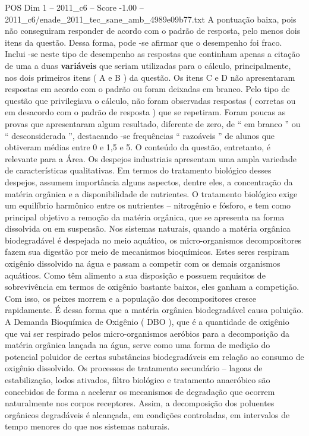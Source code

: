 \begin{textsample}{POS Dim 1 – 2011\_c6 – Score -1.00 – 2011\_c6/enade\_2011\_tec\_sane\_amb\_4989e09b77.txt}
A pontuação baixa, pois não conseguiram responder de acordo com o padrão de resposta, pelo menos dois itens da questão.
Dessa forma, pode -se afirmar que o desempenho foi fraco.
Inclui -se neste tipo de desempenho as respostas que continham apenas a citação de uma a duas \textbf{variáveis} que seriam utilizadas para o cálculo, principalmente, nos dois primeiros itens ( A e B ) da questão.
Os itens C e D não apresentaram respostas em acordo com o padrão ou foram deixadas em branco.
Pelo tipo de questão que privilegiava o cálculo, não foram observadas respostas ( corretas ou em desacordo com o padrão de resposta ) que se repetiram.
Foram poucas as provas que apresentaram algum resultado, diferente de zero, de “ em branco ” ou “ desconsiderada ”, destacando -se frequências “ razoáveis ” de alunos que obtiveram médias entre 0 e 1,5 e 5.
O conteúdo da questão, entretanto, é relevante para a Área.
Os despejos industriais apresentam uma ampla variedade de características qualitativas.
Em termos do tratamento biológico desses despejos, assumem importância alguns aspectos, dentre eles, a concentração da matéria orgânica e a disponibilidade de nutrientes.
O tratamento biológico exige um equilíbrio harmônico entre os nutrientes – nitrogênio e fósforo, e tem como principal objetivo a remoção da matéria orgânica, que se apresenta na forma dissolvida ou em suspensão.
Nos sistemas naturais, quando a matéria orgânica biodegradável é despejada no meio aquático, os micro-organismos decompositores fazem sua digestão por meio de mecanismos bioquímicos.
Estes seres respiram oxigênio dissolvido na água e passam a competir com os demais organismos aquáticos.
Como têm alimento a sua disposição e possuem requisitos de sobrevivência em termos de oxigênio bastante baixos, eles ganham a competição.
Com isso, os peixes morrem e a população dos decompositores cresce rapidamente.
É dessa forma que a matéria orgânica biodegradável causa poluição.
A Demanda Bioquímica de Oxigênio ( DBO ), que é a quantidade de oxigênio que vai ser respirado pelos micro-organismos aeróbios para a decomposição da matéria orgânica lançada na água, serve como uma forma de medição do potencial poluidor de certas substâncias biodegradáveis em relação ao consumo de oxigênio dissolvido.
Os processos de tratamento secundário – lagoas de estabilização, lodos ativados, filtro biológico e tratamento anaeróbico são concebidos de forma a acelerar os mecanismos de degradação que ocorrem naturalmente nos corpos receptores.
Assim, a decomposição dos poluentes orgânicos degradáveis é alcançada, em condições controladas, em intervalos de tempo menores do que nos sistemas naturais.

\end{textsample}
